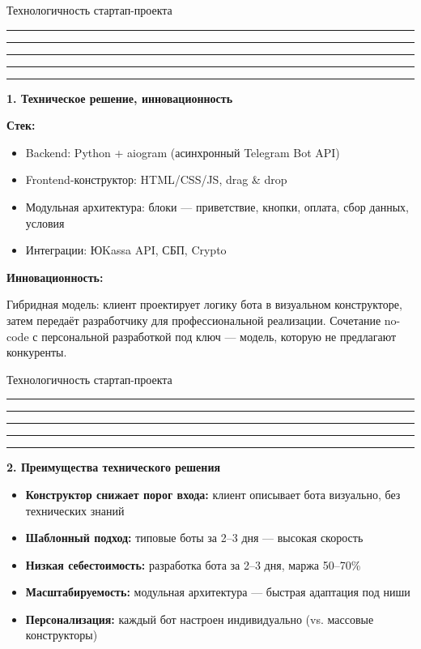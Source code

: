 \documentclass[aspectratio=169, 11pt]{beamer}
\newcommand{\cbar}{%
  \textcolor{cPink}{\rule{0.2\linewidth}{2pt}}%
  \textcolor{cPurple}{\rule{0.2\linewidth}{2pt}}%
  \textcolor{cRed}{\rule{0.2\linewidth}{2pt}}%
  \textcolor{cOrange}{\rule{0.2\linewidth}{2pt}}%
  \textcolor{cBlue}{\rule{0.2\linewidth}{2pt}}\par\medskip}
\begin{document}
\begin{frame}{Технологичность стартап-проекта}
\cbar
\textbf{1. Техническое решение, инновационность}

\medskip
\textbf{\textcolor{cGray}{Стек:}}
\begin{itemize}\setlength\itemsep{0pt}
  \item Backend: Python + aiogram (асинхронный Telegram Bot API)
  \item Frontend-конструктор: HTML/CSS/JS, drag \& drop
  \item Модульная архитектура: блоки --- приветствие, кнопки, оплата, сбор данных, условия
  \item Интеграции: ЮKassa API, СБП, Crypto
\end{itemize}

\medskip
\textbf{\textcolor{cGray}{Инновационность:}}

Гибридная модель: клиент проектирует логику бота в визуальном конструкторе, затем передаёт разработчику для профессиональной реализации. Сочетание no-code с персональной разработкой \guillemotleft{}под ключ\guillemotright{} --- модель, которую не предлагают конкуренты.
\end{frame}

\begin{frame}{Технологичность стартап-проекта}
\cbar
\textbf{2. Преимущества технического решения}

\begin{itemize}\setlength\itemsep{3pt}
  \item \textbf{Конструктор снижает порог входа:} клиент описывает бота визуально, без технических знаний
  \item \textbf{Шаблонный подход:} типовые боты за 2--3 дня --- высокая скорость
  \item \textbf{Низкая себестоимость:} разработка бота за 2--3 дня, маржа 50--70\%
  \item \textbf{Масштабируемость:} модульная архитектура --- быстрая адаптация под ниши
  \item \textbf{Персонализация:} каждый бот настроен индивидуально (vs. массовые конструкторы)
\end{itemize}
\end{frame}
\end{document}
